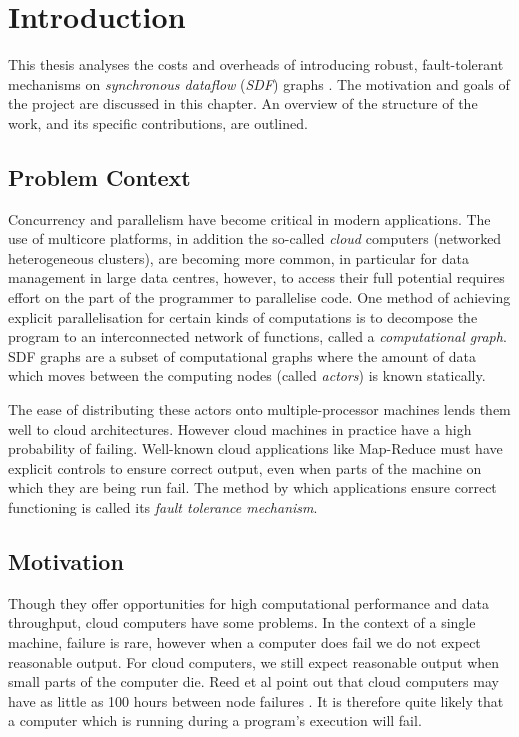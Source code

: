 \chapter{Introduction}

This thesis analyses the costs and overheads of introducing robust, fault-tolerant mechanisms on {\em synchronous dataflow} ({\em SDF}) graphs \cite{sdfBook}.
The motivation and goals of the project are discussed in this chapter.
An overview of the structure of the work, and its specific contributions, are outlined.

\section{Problem Context}

Concurrency and parallelism have become critical in modern applications.
The use of multicore platforms, in addition the so-called {\em cloud} computers (networked heterogeneous clusters), are becoming more common, in particular for data management in large data centres, however, to access their full potential requires effort on the part of the programmer to parallelise code.
One method of achieving explicit parallelisation for certain kinds of computations is to decompose the program to an interconnected network of functions, called a {\em computational graph}.
SDF graphs are a subset of computational graphs where the amount of data which moves between the computing nodes (called {\em actors}) is known statically.

The ease of distributing these actors onto multiple-processor machines lends them well to cloud architectures.
However cloud machines in practice have a high probability of failing.
Well-known cloud applications like Map-Reduce \cite{dea08} must have explicit controls to ensure correct output, even when parts of the machine on which they are being run fail.
The method by which applications ensure correct functioning is called its {\em fault tolerance mechanism}.

\section{Motivation}

Though they offer opportunities for high computational performance and data throughput, cloud computers have some problems.
In the context of a single machine, failure is rare, however when a computer does fail we do not expect reasonable output.
For cloud computers, we still expect reasonable output when small parts of the computer die.
Reed et al point out that cloud computers may have as little as 100 hours between node failures \cite{ree06}.
It is therefore quite likely that a computer which is running during a program's execution will fail.

